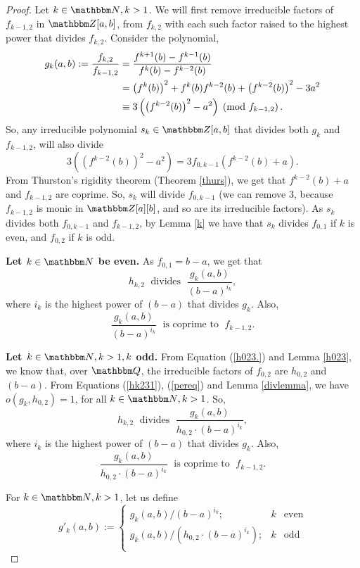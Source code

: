 \documentclass[10pt,a4paper]{amsart}
\newcommand{\N}{{\mathbbm N}}
\newcommand{\Q}{{\mathbbm Q}}
\newcommand{\Z}{{\mathbbm Z}}
\renewcommand{\eqref}[1]{(\ref{#1})}
\begin{document}
    \begin{proof}
        Let $k\in \N, k > 1$. We will first remove irreducible factors of $f_{k-1,2}$ in $\Z[a,b]$, from $f_{k,2}$ with each such factor raised to the highest power that divides $f_{k,2}$.
        Consider the polynomial, 
        \begin{align}\label{hk231}
             g_{k}(a,b):= \frac{f_{k,2}}{f_{k-1,2}} & = \frac{f^{k+1}(b)-f^{k-1}(b)}{f^{k}(b)-f^{k-2}(b)}\notag \\
             & = \left(f^{k}(b)\right)^{2}+f^{k}(b)f^{k-2}(b)+\left(f^{k-2}(b)\right)^{2}- 3a^{2}\notag \\
             & \equiv 3\left(\left(f^{k-2}(b)\right)^{2}-a^{2}\right)\; \left( \text{mod } f_{k-1,2}\right).
        \end{align}
        So, any irreducible polynomial $s_{k}\in \Z[a,b]$ that divides both $g_{k}$ and $f_{k-1,2}$, will also divide 
        \begin{equation}\label{pereq}
            3\left((f^{k-2}(b))^{2}-a^{2}\right)=3 f_{0,k-1} (f^{k-2}(b)+a).
        \end{equation}
        From Thurston's rigidity theorem (Theorem \ref{thurs}), we get that $f^{k-2}(b)+a$  and $f_{k-1,2}$ are coprime. So, $s_{k}$ will divide $f_{0,k-1}$ (we can remove $3$, because $f_{k-1,2}$ is monic in $\Z[a][b]$, and so are its irreducible factors). As $s_{k}$ divides both $f_{0,k-1}$ and $f_{k-1,2}$, by Lemma \ref{k} we have that $s_{k}$ divides $f_{0,1}$ if $k$ is even, and $f_{0,2}$ if $k$ is odd.

        \textbf{Let $k\in \N$ be even.} As $f_{0,1}= b-a$, we get that 
        $$h_{k,2}\; \text{ divides }\; \frac{g_{k}(a,b)}{(b-a)^{i_{k}}},$$ where $i_{k}$ is the highest power of $(b-a)$ that divides $g_{k}$. Also, 
        $$\frac{g_{k}(a,b)}{(b-a)^{i_{k}}}\;\text{ is coprime to }\;f_{k-1,2}.$$

        \textbf{Let $k\in \N, k>1, k$ odd.} 
        From Equation \eqref{h023.} and Lemma \ref{h023}, we know that, over $\Q$, the irreducible factors of $f_{0,2}$ are $h_{0,2}$ and $(b-a)$. From Equations \eqref{hk231}, \eqref{pereq} and Lemma \ref{divlemma}, we have $o(g_{k},h_{0,2})=1$, for all $k\in \N, k>1$. So, 
        $$h_{k,2}\; \text{ divides }\; \frac{g_{k}(a,b)}{h_{0,2}\cdot (b-a)^{i_{k}}},$$ 
        where $i_{k}$ is the highest power of $(b-a)$ that divides $g_{k}$. Also,
        $$\frac{g_{k}(a,b)}{h_{0,2}\cdot (b-a)^{i_{k}}}\;\text{ is coprime to }\;f_{k-1,2}.$$

        For $k\in \N, k>1$, let us define \begin{equation}\label{hk232}
            g'_{k}(a,b) := \left\{ \begin{array}{rcl}
                g_{k}(a,b)/(b-a)^{i_{k}}; & k &\mbox{even} \\ g_{k}(a,b)/(h_{0,2}\cdot (b-a)^{i_{k}}); & k & \mbox{odd} \\
            \end{array}\right.
        \end{equation}


\end{proof}
\end{document}
